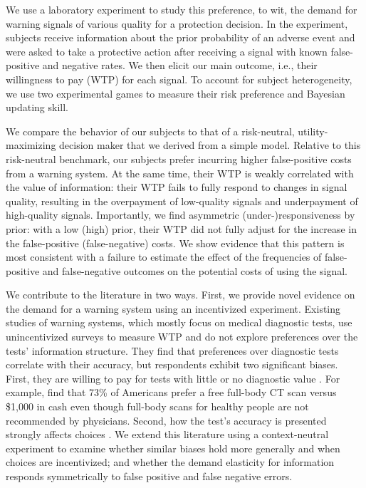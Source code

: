 \documentclass[12pt,a4paper]{article}
\begin{document}
We use a laboratory experiment to study this preference, to wit, the demand for warning signals of various quality for a protection decision.
In the experiment, subjects receive information about the prior probability of an adverse event and were asked to take a protective action after receiving a signal with known false-positive and negative rates. We then elicit our main outcome, i.e., their willingness to pay (WTP) for each signal. To account for subject heterogeneity, we use two experimental games to measure their risk preference and Bayesian updating skill.

We compare the behavior of our subjects to that of a risk-neutral, utility-maximizing decision maker that we derived from a simple model. Relative to this risk-neutral benchmark, our subjects prefer incurring higher false-positive costs from a warning system. At the same time, their WTP is weakly correlated with the value of information: their WTP fails to fully respond to changes in signal quality, resulting in the overpayment of low-quality signals and underpayment of high-quality signals. Importantly, we find asymmetric (under-)responsiveness by prior: 
with a low (high) prior, their WTP did not fully adjust for the increase in the false-positive (false-negative) costs.
We show evidence that this pattern is most consistent with a failure to estimate the effect of the frequencies of false-positive and false-negative outcomes on the potential costs of using the signal. 


We contribute to the literature in two ways. First, we provide novel evidence on the demand for a warning system using an incentivized experiment. Existing studies of warning systems, which mostly focus on medical diagnostic tests, use unincentivized surveys to measure WTP and do not explore preferences over the tests' information structure. They find that preferences over diagnostic tests correlate with their accuracy, but respondents exhibit two significant biases. First, they are willing to pay for tests with little or no diagnostic value \citep{schwartz_enthusiasm_2004, neumann_willingness--pay_2012}. For example, \citet{schwartz_enthusiasm_2004} find that 73\% of Americans prefer a free full-body CT scan versus \$1,000 in cash even though full-body scans for healthy people are not recommended by physicians. Second, how the test's accuracy is presented strongly affects choices \citep{howard_does_2009}. We extend this literature using a context-neutral experiment to examine whether similar biases hold more generally and when choices are incentivized; and whether the demand elasticity for information responds symmetrically to false positive and false negative errors. 
\end{document}
